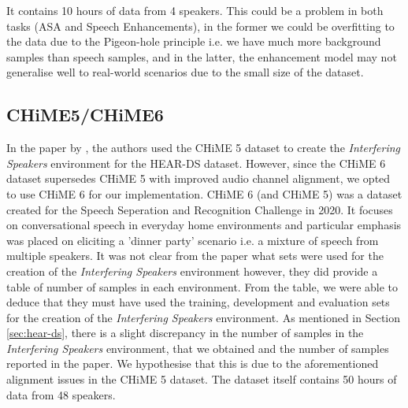 \documentclass[logo,bsc,singlespacing,parskip,online]{infthesis}
\begin{document}
It contains 10 hours of data from 4 speakers. This could be a problem in both tasks (ASA and Speech Enhancements), in the former
we could be overfitting to the data due to the Pigeon-hole principle i.e. we have much more background samples than speech samples, 
and in the latter, the enhancement model may not generalise well to real-world scenarios due to the small size of the dataset. 


\subsection{CHiME5/CHiME6}
In the paper by \citet{Huwel2020HearDS}, the authors used the CHiME 5 dataset to create the \textit{Interfering Speakers} environment for the HEAR-DS dataset.
However, since the CHiME 6 dataset supersedes CHiME 5 with improved audio channel alignment, we opted to use CHiME 6 for our implementation.
CHiME 6 (and CHiME 5) was a dataset created for the Speech Seperation and Recognition Challenge in 2020. It 
focuses on conversational speech in everyday home environments and particular emphasis was placed on 
eliciting a 'dinner party' scenario i.e. a mixture of speech from multiple speakers. It was not 
clear from the paper what sets were used for the creation of the \textit{Interfering Speakers} environment 
however, they did provide a table of number of samples in each environment. From the table, we 
were able to deduce that they must have used the training, development and evaluation sets for the creation of the \textit{Interfering Speakers} environment.
As mentioned in Section \ref{sec:hear-ds}, there is a slight discrepancy in the number of samples in the \textit{Interfering Speakers} environment, 
that we obtained and the number of samples reported in the paper. We hypothesise that this is due to the aforementioned alignment issues in the CHiME 5 dataset.
The dataset itself contains 50 hours of data from 48 speakers.
\end{document}
